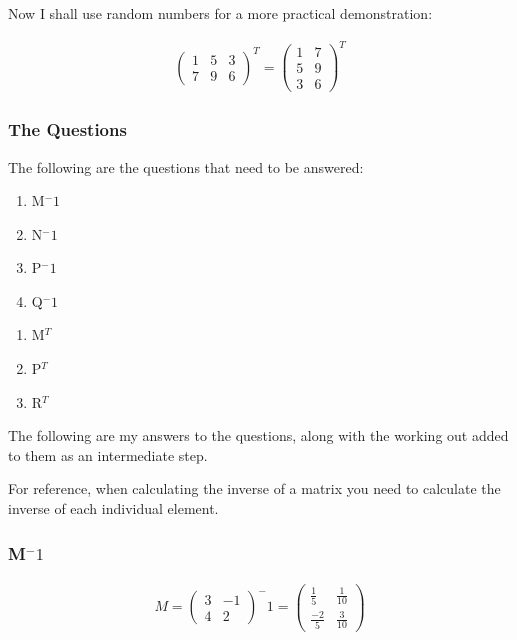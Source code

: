 \documentclass[a4paper,10pt]{article}
\begin{document}
        Now I shall use random numbers for a more practical demonstration:

        \begin{align*}
          \begin{pmatrix}
            1 & 5 & 3\\
            7 & 9 & 6
          \end{pmatrix}
          ^T
           =
          \begin{pmatrix}
            1 & 7\\
            5 & 9\\
            3 & 6
          \end{pmatrix}
          ^T
        \end{align*}

        \subsubsection{The Questions}
        The following are the questions that need to be answered:
        \begin{enumerate}
          \item M$^-1$
          \item N$^-1$
          \item P$^-1$
          \item Q$^-1$
        \end{enumerate}
        \begin{enumerate}
          \item M$^T$
          \item P$^T$
          \item R$^T$
        \end{enumerate}

        The following are my answers to the questions, along with the working out added to them as an intermediate step.

        For reference, when calculating the inverse of a matrix you need to calculate the inverse of each individual element.

        \subsubsection{M$^-1$}
          \begin{align*}
            M =
            \begin{pmatrix}
              3 & -1\\
              4 &  2
            \end{pmatrix}
            ^-1
            =
            \begin{pmatrix}
              \frac{1}{5} & \frac{1}{10}\\
             \frac{-2}{5} & \frac{3}{10}
            \end{pmatrix}
          \end{align*}
\end{document}
